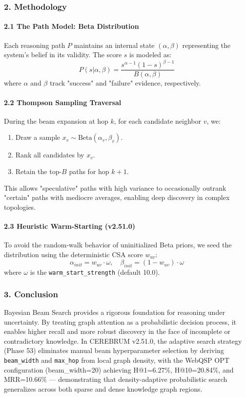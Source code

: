 \subsubsection{2. Methodology}

\paragraph{2.1 The Path Model: Beta Distri\-bution}
Each reasoning path $P$ maintains an internal state $(\alpha, \beta)$ repre\-senting the system's belief in its validity. The score $s$ is modeled as:
\begin{equation}
P(s | \alpha, \beta) = \frac{s^{\alpha-1} (1-s)^{\beta-1}}{B(\alpha, \beta)}
\end{equation}
where $\alpha$ and $\beta$ track "success" and "failure" evidence, respe\-ctively.

\paragraph{2.2 Thompson Sampling Traversal}
During the beam expansion at hop $k$, for each candidate neighbor $v$, we:
\begin{enumerate}
\item Draw a sample $x_v \sim \text{Beta}(\alpha_v, \beta_v)$.
\item Rank all candidates by $x_v$.
\item Retain the top-$B$ paths for hop $k+1$.

\end{enumerate}
This allows "speculative" paths with high variance to occas\-ionally outrank "certain" paths with mediocre averages, enabling deep discovery in complex topologies.

\paragraph{2.3 Heuristic Warm-Starting (v2.51.0)}
To avoid the random-walk behavior of unini\-tialized Beta priors, we seed the distr\-ibution using the deter\-ministic CSA score $w_{uv}$:
\begin{equation}
\alpha_{init} = w_{uv} \cdot \omega, \quad \beta_{init} = (1-w_{uv}) \cdot \omega
\end{equation}
where $\omega$ is the \texttt{warm\_start\_strength} (default 10.0).

\subsubsection{3. Conclusion}
Bayesian Beam Search provides a rigorous foundation for reasoning under uncertainty. By treating graph attention as a proba\-bilistic decision process, it enables higher recall and more robust discovery in the face of incomplete or contr\-adictory knowledge. In CEREBRUM v2.51.0, the adaptive search strategy (Phase 53) eliminates manual beam hyper\-parameter selection by deriving \texttt{beam\_width} and \texttt{max\_hop} from local graph density, with the WebQSP OPT confi\-guration (beam\_width=20) achieving H@1=6.27\%, H@10=20.84\%, and MRR=10.66\% — demon\-strating that density-adaptive proba\-bilistic search generalizes across both sparse and dense knowledge graph regions.

